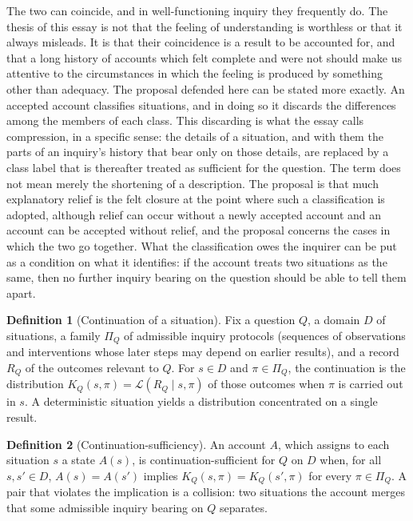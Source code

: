 \documentclass[11pt,letterpaper]{article}
\theoremstyle{definition}
\newtheorem{definition}{Definition}
\begin{document}
The two can coincide, and in well-functioning inquiry they frequently do. The thesis of this essay is not that the feeling of understanding is worthless or that it always misleads. It is that their coincidence is a result to be accounted for, and that a long history of accounts which felt complete and were not should make us attentive to the circumstances in which the feeling is produced by something other than adequacy. The proposal defended here can be stated more exactly. An accepted account classifies situations, and in doing so it discards the differences among the members of each class. This discarding is what the essay calls compression, in a specific sense: the details of a situation, and with them the parts of an inquiry's history that bear only on those details, are replaced by a class label that is thereafter treated as sufficient for the question. The term does not mean merely the shortening of a description. The proposal is that much explanatory relief is the felt closure at the point where such a classification is adopted, although relief can occur without a newly accepted account and an account can be accepted without relief, and the proposal concerns the cases in which the two go together. What the classification owes the inquirer can be put as a condition on what it identifies: if the account treats two situations as the same, then no further inquiry bearing on the question should be able to tell them apart.

\begin{definition}[Continuation of a situation]
Fix a question $Q$, a domain $D$ of situations, a family $\Pi_Q$ of admissible inquiry protocols (sequences of observations and interventions whose later steps may depend on earlier results), and a record $R_Q$ of the outcomes relevant to $Q$. For $s \in D$ and $\pi \in \Pi_Q$, the continuation is the distribution $K_Q(s,\pi) = \mathcal{L}(R_Q \mid s, \pi)$ of those outcomes when $\pi$ is carried out in $s$. A deterministic situation yields a distribution concentrated on a single result.
\end{definition}

\begin{definition}[Continuation-sufficiency]
An account $A$, which assigns to each situation $s$ a state $A(s)$, is continuation-sufficient for $Q$ on $D$ when, for all $s, s' \in D$, $A(s) = A(s')$ implies $K_Q(s,\pi) = K_Q(s',\pi)$ for every $\pi \in \Pi_Q$. A pair that violates the implication is a collision: two situations the account merges that some admissible inquiry bearing on $Q$ separates.
\end{definition}
\end{document}
